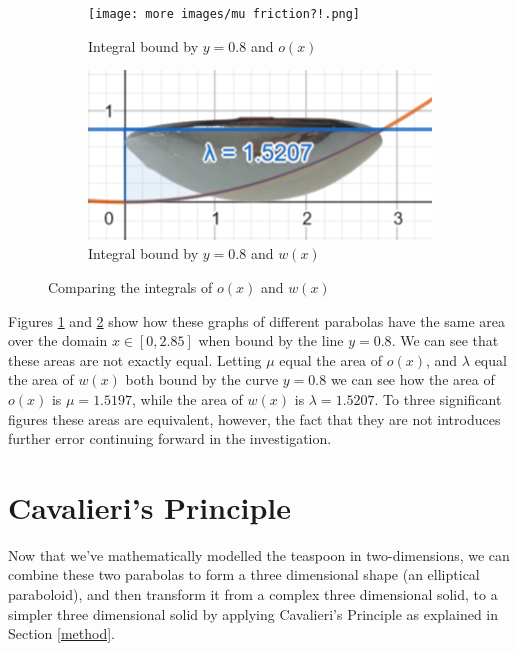 \documentclass[12pt]{article}
\begin{document}
\begin{figure}[h]
     \centering
     \begin{subfigure}[b]{0.45\textwidth}
         \centering
         \texttt{[image: more images/mu friction?!.png]}
         \caption{Integral bound by $y=0.8$ and $o(x)$}
         \label{fig:ox.graph}
     \end{subfigure}
     \hfill
     \begin{subfigure}[b]{0.45\textwidth}
         \centering
         \includegraphics[width=\textwidth]{more images/lambda babay.png}
         \caption{Integral bound by $y=0.8$ and $w(x)$}
         \label{fig:wx.graph}
     \end{subfigure}
     \hfill
        \caption{Comparing the integrals of $o(x)$ and $w(x)$}
        \label{fig:para2.graph}
\end{figure}

Figures \ref{fig:ox.graph} and \ref{fig:wx.graph} show how these graphs of different parabolas have the same area over the domain $x \in [0,2.85]$ when bound by the line $y=0.8$. We can see that these areas are not exactly equal. Letting $\mu$ equal the area of $o(x)$, and $\lambda$ equal the area of $w(x)$ both bound by the curve $y=0.8$ we can see how the area of $o(x)$ is $\mu = 1.5197$, while the area of $w(x)$ is $\lambda = 1.5207$. To three significant figures these areas are equivalent, however, the fact that they are not introduces further error continuing forward in the investigation.

\section{Cavalieri's Principle}

Now that we've mathematically modelled the teaspoon in two-dimensions, we can combine these two parabolas to form a three dimensional shape (an elliptical paraboloid), and then transform it from a complex three dimensional solid, to a simpler three dimensional solid by applying Cavalieri's Principle as explained in Section \ref{method}. 
\end{document}

